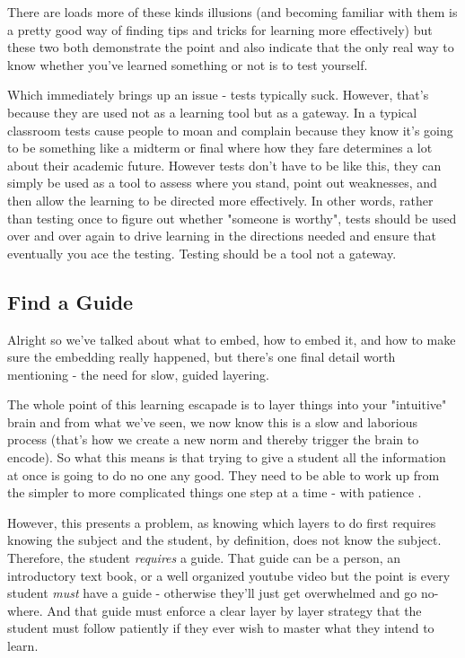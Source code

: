 \documentclass[11pt,a5paper]{book}
\begin{document}
There are loads more of these kinds illusions (and becoming familiar with them is a pretty good way of finding tips and tricks for learning more effectively) but these two both demonstrate the point and also indicate that the only real way to know whether you've learned something or not is to test yourself. 
\newline

Which immediately brings up an issue - tests typically suck. However, that's because they are used not as a learning tool but as a gateway. In a typical classroom tests cause people to moan and complain because they know it's going to be something like a midterm or final where how they fare determines a lot about their academic future. However tests don't have to be like this, they can simply be used as a tool to assess where you stand, point out weaknesses, and then allow the learning to be directed more effectively. In other words, rather than testing once to figure out whether "someone is worthy", tests should be used over and over again to drive learning in the directions needed and ensure that eventually you ace the testing. Testing should be a tool not a gateway.

\subsection{Find a Guide}
Alright so we've talked about what to embed, how to embed it, and how to make sure the embedding really happened, but there's one final detail worth mentioning - the need for slow, guided layering. 
\newline

The whole point of this learning escapade is to layer things into your "intuitive" brain and from what we've seen, we now know this is a slow and laborious process (that's how we create a new norm and thereby trigger the brain to encode). So what this means is that trying to give a student all the information at once is going to do no one any good. They need to be able to work up from the simpler to more complicated things one step at a time - with patience \cite{ericsson}. 
\newline

However, this presents a problem, as knowing which layers to do first requires knowing the subject and the student, by definition, does not know the subject. Therefore, the student \textit{requires} a guide. That guide can be a person, an introductory text book, or a well organized youtube video but the point is every student \textit{must} have a guide - otherwise they'll just get overwhelmed and go no-where. And that guide must enforce a clear layer by layer strategy that the student must follow patiently if they ever wish to master what they intend to learn. 
\newline
\end{document}
